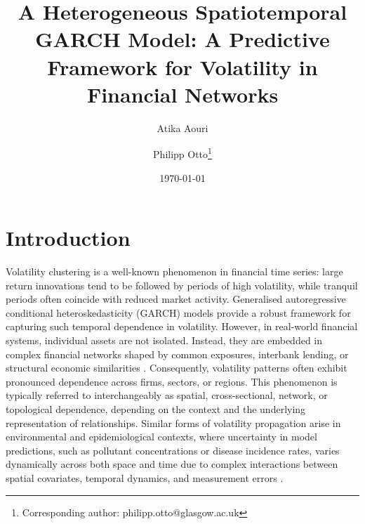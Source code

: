 \documentclass[fleqn,11pt]{article}
\date{\today}
\title{A Heterogeneous Spatiotemporal GARCH Model: A Predictive Framework for Volatility in Financial Networks}
\author[1]{Atika Aouri}
\author[2]{Philipp Otto\footnote{Corresponding author: philipp.otto@glasgow.ac.uk}}
\affil[1]{Abdelhafid Boussouf University Center, Mila, Algeria}
\affil[2]{University of Glasgow, School of Mathematics and Statistics, UK}
\begin{document}
\maketitle



\section{Introduction}

Volatility clustering is a well-known phenomenon in financial time series: large return innovations tend to be followed by periods of high volatility, while tranquil periods often coincide with reduced market activity. Generalised autoregressive conditional heteroskedasticity (GARCH) models \citep{engle1982autoregressive, bollerslev1986generalized} provide a robust framework for capturing such temporal dependence in volatility. However, in real-world financial systems, individual assets are not isolated. Instead, they are embedded in complex financial networks shaped by common exposures, interbank lending, or structural economic similarities \citep[see, e.g.,][]{diebold2023past, chen2019tail, mattera2024network}. Consequently, volatility patterns often exhibit pronounced dependence across firms, sectors, or regions. This phenomenon is typically referred to interchangeably as spatial, cross-sectional, network, or topological dependence, depending on the context and the underlying representation of relationships. Similar forms of volatility propagation arise in environmental and epidemiological contexts, where uncertainty in model predictions, such as pollutant concentrations or disease incidence rates, varies dynamically across both space and time due to complex interactions between spatial covariates, temporal dynamics, and measurement errors \citep{huang2011class,otto2018generalised,otto2023dynamic,rodeschini2024scenario}.
\end{document}
